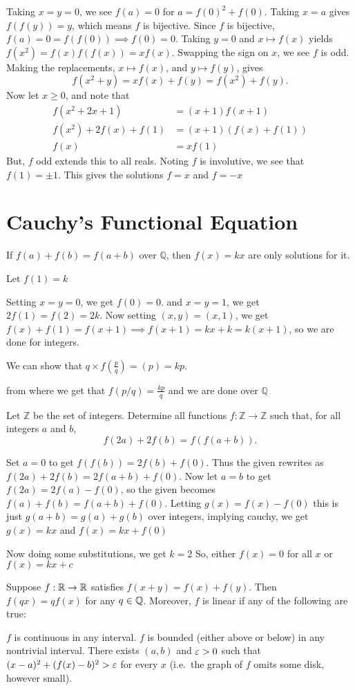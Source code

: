 Taking $x=y=0$, we see $f(a)=0$ for $a=f(0)^2+f(0)$. Taking $x=a$ gives $f(f(y))=y$, which means $f$ is bijective. Since $f$ is bijective, $f(a)=0=f(f(0))\implies f(0)=0$. Taking $y=0$ and $x\mapsto f(x)$ yields $f(x^2)=f(x)f(f(x))=xf(x)$. Swapping the sign on $x$, we see $f$ is odd. Making the replacements, $x\mapsto f(x)$, and $y\mapsto f(y)$, gives$$f(x^2+y)=xf(x)+f(y)=f(x^2)+f(y).$$Now let $x\ge 0$, and note that
\begin{align*}
f(x^2+2x+1)&=(x+1)f(x+1)\\
f(x^2)+2f(x)+f(1)&=(x+1)(f(x)+f(1))\\
f(x)&=xf(1)
\end{align*}But, $f$ odd extends this to all reals. Noting $f$ is involutive, we see that $f(1)=\pm 1$. This gives the solutions $\boxed{f=x}$ and $\boxed{f=-x}$

\section{Cauchy's Functional Equation}
\begin{theorem}
If $ f(a)+f(b)=f(a+b) $ over $\mathbb{Q}$, then $f(x)=kx$ are only solutions for it. 
\end{theorem}
Let $f(1)=k$

Setting $x=y=0$, we get $f(0)=0$. and $x=y=1$, we get $2f(1)=f(2)=2k$.
Now setting $(x,y)=(x,1)$, we get $f(x)+f(1)=f(x+1) \implies f(x+1)=kx+k=k(x+1)$, so we are done for integers.

We can show that $q\times f(\frac{p}{q})=(p)=kp$.

from where we get that $f(p/q)=\frac{kp}{q}$ and we are done over $\mathbb{Q}$

\begin{example}[IMO 2019 P1]
Let $\mathbb{Z}$ be the set of integers. Determine all functions $f: \mathbb{Z} \rightarrow \mathbb{Z}$ such that, for all integers $a$ and $b$,$$f(2a)+2f(b)=f(f(a+b)).$$
\end{example}
Set $a = 0$ to get $f(f(b)) = 2f(b) + f(0)$. Thus the given rewrites as $f(2a) + 2f(b) = 2f(a + b) + f(0)$. Now let $a = b$ to get $f(2a) = 2f(a) - f(0)$, so the given becomes $f(a) + f(b) = f(a + b) + f(0)$. Letting $g(x) = f(x) - f(0)$ this is just $g(a + b) = g(a) + g(b) $ over integers, implying cauchy, we get $g(x) = kx$ and $f(x) = kx + f(0)$

Now doing some substitutions, we get $k=2$
So, either $f(x)=0$ for all $x$ or $f(x)=kx+c$ 
\begin{theorem}
	Suppose $f : \mathbb R \to \mathbb R$ satisfies $f(x+y) = f(x) + f(y)$.
	Then $f(qx) = qf(x)$ for any $q \in \mathbb Q$.
	Moreover, $f$ is linear if any of the following are true:
	\begin{itemize}
		\ii $f$ is continuous in any interval. 
		\ii $f$ is bounded (either above or below) in any nontrivial interval.
		\ii There exists $(a,b)$ and $\varepsilon > 0$ such that $(x-a)^2 + (f(x)-b)^2 > \varepsilon$ for every $x$
		(i.e.\ the graph of $f$ omits some disk, however small).
	\end{itemize}
\end{theorem}

